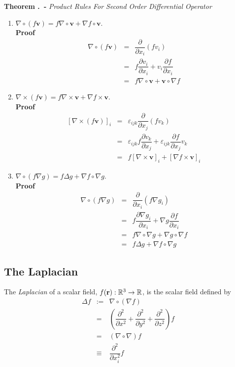 \documentclass[11pt,a4paper]{article}
\begin{document}
 \textbf{Theorem .\ - }\textit{Product Rules For Second Order Differential Operator}
\begin{enumerate}[label=\roman*)]
  \item$\nabla\circ(f\textbf{v})=f\nabla\circ\textbf{v}+\nabla f\circ\textbf{v}$.\\
  \textbf{Proof}
  \[\begin{array}{rcl}
  \nabla\circ(f\textbf{v})&=&\dfrac{\partial}{\partial x_i}(fv_i)\\
  &=&f\dfrac{\partial v_i}{\partial x_i}+v_i\dfrac{\partial f}{\partial x_i}\\
  &=&f\nabla\circ\textbf{v}+\textbf{v}\circ\nabla f
  \end{array}\]
  \item$\nabla\times(f\textbf{v})=f\nabla\times\textbf{v}+\nabla f\times\textbf{v}$.\\
  \textbf{Proof}
  \[\begin{array}{rcl}
  [\nabla\times(f\textbf{v})]_i&=&\varepsilon_{ijk}\dfrac{\partial}{\partial x_j}(fv_k)\\
  &=&\varepsilon_{ijk}f\dfrac{\partial v_k}{\partial x_j}+\varepsilon_{ijk}\dfrac{\partial f}{\partial x_j}v_k\\
  &=&f[\nabla\times\textbf{v}]_i+[\nabla f\times\textbf{v}]_i
  \end{array}\]
  \item$\nabla\circ(f\nabla g)=f\Delta g+\nabla f\circ\nabla g$.\\
  \textbf{Proof}
  \[\begin{array}{rcl}
  \nabla\circ(f\nabla g)&=&\dfrac{\partial}{\partial x_i}(f\nabla g_i)\\
  &=&f\dfrac{\partial \nabla g_i}{\partial  x_i}+\nabla g\dfrac{\partial f}{\partial x_i}\\
  &=&f\nabla\circ\nabla g+\nabla g\circ\nabla f\\
  &=&f\Delta g+\nabla f\circ\nabla g
  \end{array}\]
\end{enumerate}

\subsection{The Laplacian}

The \textit{Laplacian} of a scalar field, $f(\textbf{r}):\mathbb{R}^3\to\mathbb{R}$, is the scalar field defined by
\[\begin{array}{rrl}
\Delta f&:=& \nabla\circ(\nabla f)\\
&=&\left(\dfrac{\partial^2}{\partial x^2}+\dfrac{\partial^2}{\partial y^2}+\dfrac{\partial^2}{\partial z^2}\right)f\\
&=&(\nabla\circ\nabla)f\\
&\equiv&\dfrac{\partial^2}{\partial x_i^2}f
\end{array}\]
\end{document}
